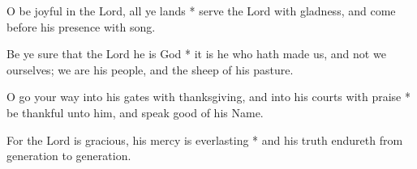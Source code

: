 O be joyful in the Lord, all ye lands * serve the Lord with gladness, and come before his presence with song.

Be ye sure that the Lord he is God * it is he who hath made us, and not we ourselves; we are his people, and the sheep of his pasture.

O go your way into his gates with thanksgiving, and into his courts with praise * be thankful unto him, and speak good of his Name.

For the Lord is gracious, his mercy is everlasting * and his truth endureth from generation to generation.